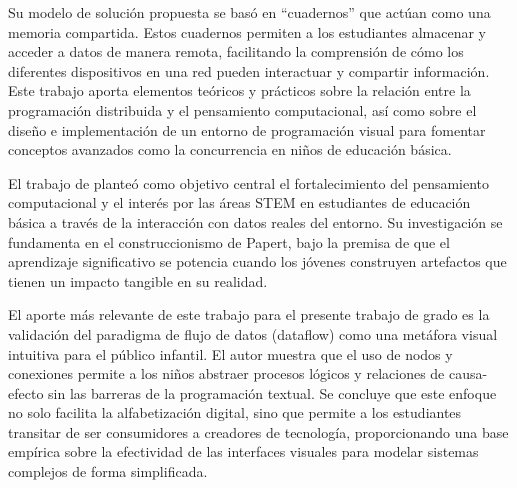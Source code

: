 Su modelo de solución propuesta se basó en “cuadernos” que actúan como una memoria compartida. Estos cuadernos permiten a los estudiantes almacenar y acceder a datos de manera remota, facilitando la comprensión de cómo los diferentes dispositivos en una red pueden interactuar y compartir información. Este trabajo aporta elementos teóricos y prácticos sobre la relación entre la programación distribuida y el pensamiento computacional, así como sobre el diseño e implementación de un entorno de programación visual para fomentar conceptos avanzados como la concurrencia en niños de educación básica.


El trabajo de  planteó como objetivo central el fortalecimiento del pensamiento computacional y el interés por las áreas STEM en estudiantes de educación básica a través de la interacción con datos reales del entorno. Su investigación se fundamenta en el construccionismo de Papert, bajo la premisa de que el aprendizaje significativo se potencia cuando los jóvenes construyen artefactos que tienen un impacto tangible en su realidad.

El aporte más relevante de este trabajo para el presente trabajo de grado es la validación del paradigma de flujo de datos (dataflow) como una metáfora visual intuitiva para el público infantil. El autor muestra que el uso de nodos y conexiones permite a los niños abstraer procesos lógicos y relaciones de causa-efecto sin las barreras de la programación textual. Se concluye que este enfoque no solo facilita la alfabetización digital, sino que permite a los estudiantes transitar de ser consumidores a creadores de tecnología, proporcionando una base empírica sobre la efectividad de las interfaces visuales para modelar sistemas complejos de forma simplificada.